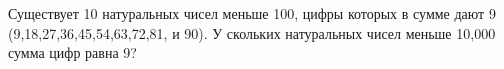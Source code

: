\question
Существует 10 натуральных чисел меньше 100, цифры которых в сумме дают  9 (9,18,27,36,45,54,63,72,81, и 90). У скольких натуральных чисел меньше 10,000 сумма цифр равна 9?
